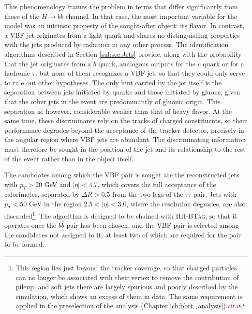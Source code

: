 This phenomenology frames the problem in terms that differ significantly from those of the $H\to b\bar{b}$ channel. In that case, the most important variable for the model was an intrinsic property of the sought-after object: its flavor. In contrast, a VBF jet originates from a light quark and shares no distinguishing properties with the jets produced by radiation in any other process. The identification algorithms described in Section \ref{subsec:Jets} provide, along with the probability that the jet originates from a $b$ quark, analogous outputs for the $c$ quark or for a hadronic $\tau$, but none of them recognizes a VBF jet, so that they could only serve to rule out other hypotheses. The only hint carried by the jet itself is the separation between jets initiated by quarks and those initiated by gluons, given that the other jets in the event are predominantly of gluonic origin. This separation is, however, considerable weaker than that of heavy flavor. At the same time, these discriminants rely on the tracks of charged constituents, so their performance degrades beyond the acceptance of the tracker detector, precisely in the angular region where VBF jets are abundant. The discriminating information must therefore be sought in the position of the jet and its relationship to the rest of the event rather than in the object itself.\medskip


The candidates among which the VBF pair is sought are the reconstructed jets with $p_T > 20$ GeV and $|\eta| < 4.7$, which covers the full acceptance of the calorimeter, separated by $\Delta R > 0.5$ from the two legs of the $\tau\tau$ pair. Jets with $p_T < 50$ GeV in the region $2.5 < |\eta| < 3.0$, where the resolution degrades, are also discarded\footnote{This region lies just beyond the tracker coverage, so that charged particles can no longer be associated with their vertex to remove the contribution of pileup, and soft jets there are largely spurious and poorly described by the simulation, which shows an excess of them in data. The same requirement is applied in the preselection of the analysis (Chapter \ref{ch:bbtt_analysis}).\textcolor{red}{cita}}. The algorithm is designed to be chained with \textsc{HH-BTag}, so that it operates once the $b\bar{b}$ pair has been chosen, and the VBF pair is selected among the candidates not assigned to it, at least two of which are required for the pair to be formed. 



